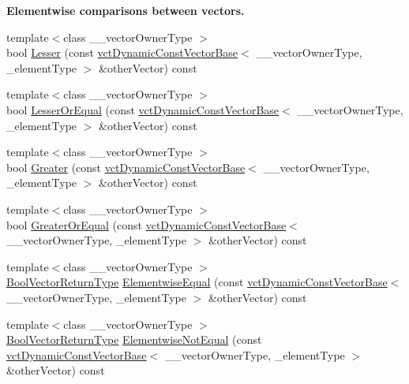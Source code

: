 \begin{Indent}{\bf Elementwise comparisons between vectors.}
\begin{DoxyCompactItemize}
\item 
{\footnotesize template$<$class \+\_\+\+\_\+vector\+Owner\+Type $>$ }\\bool \hyperlink{classvct_dynamic_const_vector_base_a80e4895533a873d7bf6d921ca16ececb}{Lesser} (const \hyperlink{classvct_dynamic_const_vector_base}{vct\+Dynamic\+Const\+Vector\+Base}$<$ \+\_\+\+\_\+vector\+Owner\+Type, \+\_\+element\+Type $>$ \&other\+Vector) const 
\item 
{\footnotesize template$<$class \+\_\+\+\_\+vector\+Owner\+Type $>$ }\\bool \hyperlink{classvct_dynamic_const_vector_base_a53da360deb15a0fc2cdd7a24ff7c13fa}{Lesser\+Or\+Equal} (const \hyperlink{classvct_dynamic_const_vector_base}{vct\+Dynamic\+Const\+Vector\+Base}$<$ \+\_\+\+\_\+vector\+Owner\+Type, \+\_\+element\+Type $>$ \&other\+Vector) const 
\item 
{\footnotesize template$<$class \+\_\+\+\_\+vector\+Owner\+Type $>$ }\\bool \hyperlink{classvct_dynamic_const_vector_base_a0074f5d79e736727d8323e4cf2700d0e}{Greater} (const \hyperlink{classvct_dynamic_const_vector_base}{vct\+Dynamic\+Const\+Vector\+Base}$<$ \+\_\+\+\_\+vector\+Owner\+Type, \+\_\+element\+Type $>$ \&other\+Vector) const 
\item 
{\footnotesize template$<$class \+\_\+\+\_\+vector\+Owner\+Type $>$ }\\bool \hyperlink{classvct_dynamic_const_vector_base_a182a16e5115f869774dcceca504467c1}{Greater\+Or\+Equal} (const \hyperlink{classvct_dynamic_const_vector_base}{vct\+Dynamic\+Const\+Vector\+Base}$<$ \+\_\+\+\_\+vector\+Owner\+Type, \+\_\+element\+Type $>$ \&other\+Vector) const 
\item 
{\footnotesize template$<$class \+\_\+\+\_\+vector\+Owner\+Type $>$ }\\\hyperlink{classvct_dynamic_const_vector_base_a2de5b9c0f8c70782c548808d3ae4a453}{Bool\+Vector\+Return\+Type} \hyperlink{classvct_dynamic_const_vector_base_a548e6c04632b8f779f207f4b5d9b5dbd}{Elementwise\+Equal} (const \hyperlink{classvct_dynamic_const_vector_base}{vct\+Dynamic\+Const\+Vector\+Base}$<$ \+\_\+\+\_\+vector\+Owner\+Type, \+\_\+element\+Type $>$ \&other\+Vector) const 
\item 
{\footnotesize template$<$class \+\_\+\+\_\+vector\+Owner\+Type $>$ }\\\hyperlink{classvct_dynamic_const_vector_base_a2de5b9c0f8c70782c548808d3ae4a453}{Bool\+Vector\+Return\+Type} \hyperlink{classvct_dynamic_const_vector_base_a00a670b1966b5404fe8f861d02d15070}{Elementwise\+Not\+Equal} (const \hyperlink{classvct_dynamic_const_vector_base}{vct\+Dynamic\+Const\+Vector\+Base}$<$ \+\_\+\+\_\+vector\+Owner\+Type, \+\_\+element\+Type $>$ \&other\+Vector) const 

\end{DoxyCompactItemize}
\end{Indent}

